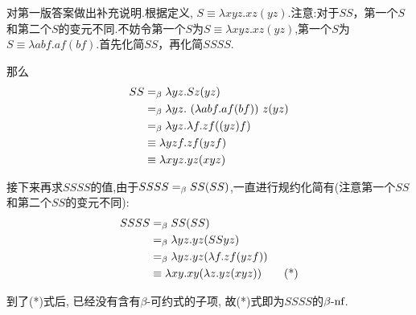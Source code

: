 \begin{solution}
{\color {red} {对第一版答案做出补充说明.}}根据定义, $S \equiv \lambda xyz.xz(yz)$.注意:对于$SS$，第一个$S$和第二个$S$的变元不同.不妨令第一个$S$为$S \equiv \lambda xyz.xz(yz)$,第一个$S$为$S \equiv \lambda abf.af(bf)$.首先化简$SS$，再化简$SSSS$.

那么
    \begin{align*}
        SS&=_{\beta} \lambda yz.Sz(yz)\\
        &=_{\beta} \lambda yz.\ (\lambda abf.af(bf)) \ z(yz)\\
        &=_{\beta} \lambda yz.\lambda f.zf((yz)f)\\
        &\equiv \lambda yzf.zf(yzf)\\
        &\equiv \lambda xyz.yz(xyz)
    \end{align*}

接下来再求$SSSS$的值,由于$SSSS=_{\beta} SS(SS)$,一直进行规约化简有(注意第一个$SS$和第二个$SS$的变元不同):
    \begin{align*}
        SSSS &=_{\beta} SS(SS)\\
        &=_{\beta} \lambda yz.yz(SSyz)\\
        &=_{\beta} \lambda yz.yz(\lambda f.zf(yzf))\\
        &\equiv \lambda xy.xy(\lambda z.yz(xyz))\tag{*}
    \end{align*}

    到了(*)式后, 已经没有含有$\beta$-可约式的子项, 故(*)式即为$SSSS$的$\beta\textrm{-nf}$.
\end{solution}